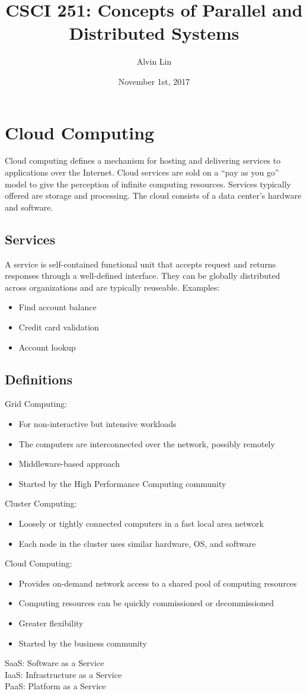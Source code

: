 \documentclass{math}
\title{CSCI 251: Concepts of Parallel and Distributed Systems}
\author{Alvin Lin}
\date{November 1st, 2017}
\begin{document}
\maketitle

\section*{Cloud Computing}
Cloud computing defines a mechanism for hosting and delivering services to
applications over the Internet. Cloud services are sold on a ``pay as you go''
model to give the perception of infinite computing resources. Services
typically offered are storage and processing. The cloud consists of a data
center's hardware and software.

\subsection*{Services}
A service is self-contained functional unit that accepts request and returns
responses through a well-defined interface. They can be globally distributed
across organizations and are typically reuseable. Examples:
\begin{itemize}
  \item Find account balance
  \item Credit card validation
  \item Account lookup
\end{itemize}

\subsection*{Definitions}
Grid Computing:
\begin{itemize}
  \item For non-interactive but intensive workloads
  \item The computers are interconnected over the network, possibly remotely
  \item Middleware-based approach
  \item Started by the High Performance Computing community
\end{itemize}
Cluster Computing:
\begin{itemize}
  \item Loosely or tightly connected computers in a fast local area network
  \item Each node in the cluster uses similar hardware, OS, and software
\end{itemize}
Cloud Computing:
\begin{itemize}
  \item Provides on-demand network access to a shared pool of computing
  resources
  \item Computing resources can be quickly commissioned or decommissioned
  \item Greater flexibility
  \item Started by the business community
\end{itemize}
SaaS: Software as a Service \\
IaaS: Infrastructure as a Service \\
PaaS: Platform as a Service
\end{document}
